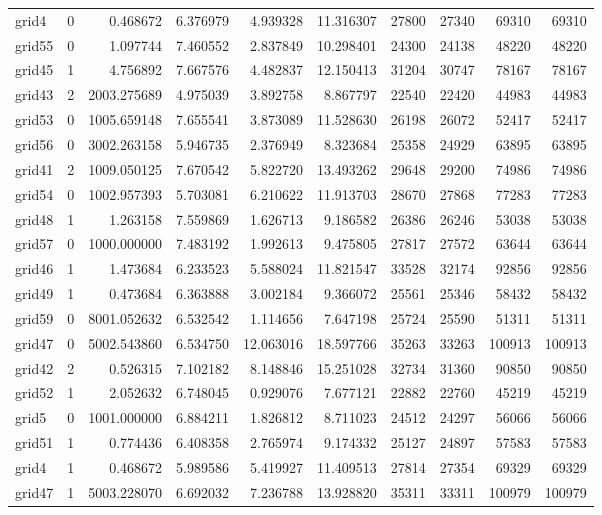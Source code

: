 \begin{longtable}{|l|r|r|r|r|r|r|r|r|r|}
grid4 & 0 & 0.468672 & 6.376979 & 4.939328 & 11.316307 & 27800 & 27340 & 69310 & 69310 \\
grid55 & 0 & 1.097744 & 7.460552 & 2.837849 & 10.298401 & 24300 & 24138 & 48220 & 48220 \\
grid45 & 1 & 4.756892 & 7.667576 & 4.482837 & 12.150413 & 31204 & 30747 & 78167 & 78167 \\
grid43 & 2 & 2003.275689 & 4.975039 & 3.892758 & 8.867797 & 22540 & 22420 & 44983 & 44983 \\
grid53 & 0 & 1005.659148 & 7.655541 & 3.873089 & 11.528630 & 26198 & 26072 & 52417 & 52417 \\
grid56 & 0 & 3002.263158 & 5.946735 & 2.376949 & 8.323684 & 25358 & 24929 & 63895 & 63895 \\
grid41 & 2 & 1009.050125 & 7.670542 & 5.822720 & 13.493262 & 29648 & 29200 & 74986 & 74986 \\
grid54 & 0 & 1002.957393 & 5.703081 & 6.210622 & 11.913703 & 28670 & 27868 & 77283 & 77283 \\
grid48 & 1 & 1.263158 & 7.559869 & 1.626713 & 9.186582 & 26386 & 26246 & 53038 & 53038 \\
grid57 & 0 & 1000.000000 & 7.483192 & 1.992613 & 9.475805 & 27817 & 27572 & 63644 & 63644 \\
grid46 & 1 & 1.473684 & 6.233523 & 5.588024 & 11.821547 & 33528 & 32174 & 92856 & 92856 \\
grid49 & 1 & 0.473684 & 6.363888 & 3.002184 & 9.366072 & 25561 & 25346 & 58432 & 58432 \\
grid59 & 0 & 8001.052632 & 6.532542 & 1.114656 & 7.647198 & 25724 & 25590 & 51311 & 51311 \\
grid47 & 0 & 5002.543860 & 6.534750 & 12.063016 & 18.597766 & 35263 & 33263 & 100913 & 100913 \\
grid42 & 2 & 0.526315 & 7.102182 & 8.148846 & 15.251028 & 32734 & 31360 & 90850 & 90850 \\
grid52 & 1 & 2.052632 & 6.748045 & 0.929076 & 7.677121 & 22882 & 22760 & 45219 & 45219 \\
grid5 & 0 & 1001.000000 & 6.884211 & 1.826812 & 8.711023 & 24512 & 24297 & 56066 & 56066 \\
grid51 & 1 & 0.774436 & 6.408358 & 2.765974 & 9.174332 & 25127 & 24897 & 57583 & 57583 \\
grid4 & 1 & 0.468672 & 5.989586 & 5.419927 & 11.409513 & 27814 & 27354 & 69329 & 69329 \\
grid47 & 1 & 5003.228070 & 6.692032 & 7.236788 & 13.928820 & 35311 & 33311 & 100979 & 100979 \\

\end{longtable}
